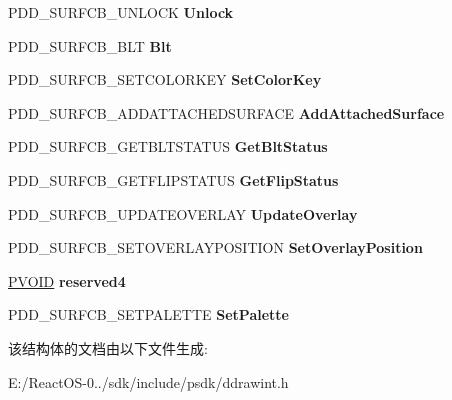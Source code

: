 \begin{DoxyCompactItemize}
P\+D\+D\+\_\+\+S\+U\+R\+F\+C\+B\+\_\+\+U\+N\+L\+O\+CK {\bfseries Unlock}
\item 
\mbox{\label{struct_d_d___s_u_r_f_a_c_e_c_a_l_l_b_a_c_k_s_a803378ce84a5ddebf064655f46c0bf34}} 
P\+D\+D\+\_\+\+S\+U\+R\+F\+C\+B\+\_\+\+B\+LT {\bfseries Blt}
\item 
\mbox{\label{struct_d_d___s_u_r_f_a_c_e_c_a_l_l_b_a_c_k_s_aa207143ebab6b0e03e54b4d7a7ff175a}} 
P\+D\+D\+\_\+\+S\+U\+R\+F\+C\+B\+\_\+\+S\+E\+T\+C\+O\+L\+O\+R\+K\+EY {\bfseries Set\+Color\+Key}
\item 
\mbox{\label{struct_d_d___s_u_r_f_a_c_e_c_a_l_l_b_a_c_k_s_a9d5d0b560662ddba80638b71e8c20d50}} 
P\+D\+D\+\_\+\+S\+U\+R\+F\+C\+B\+\_\+\+A\+D\+D\+A\+T\+T\+A\+C\+H\+E\+D\+S\+U\+R\+F\+A\+CE {\bfseries Add\+Attached\+Surface}
\item 
\mbox{\label{struct_d_d___s_u_r_f_a_c_e_c_a_l_l_b_a_c_k_s_ac423a267ea9a872103f494acae1fb590}} 
P\+D\+D\+\_\+\+S\+U\+R\+F\+C\+B\+\_\+\+G\+E\+T\+B\+L\+T\+S\+T\+A\+T\+US {\bfseries Get\+Blt\+Status}
\item 
\mbox{\label{struct_d_d___s_u_r_f_a_c_e_c_a_l_l_b_a_c_k_s_aa64709dfb2ed4a938ff433936e52659e}} 
P\+D\+D\+\_\+\+S\+U\+R\+F\+C\+B\+\_\+\+G\+E\+T\+F\+L\+I\+P\+S\+T\+A\+T\+US {\bfseries Get\+Flip\+Status}
\item 
\mbox{\label{struct_d_d___s_u_r_f_a_c_e_c_a_l_l_b_a_c_k_s_a158944a990dc71df95da2a07ab97f860}} 
P\+D\+D\+\_\+\+S\+U\+R\+F\+C\+B\+\_\+\+U\+P\+D\+A\+T\+E\+O\+V\+E\+R\+L\+AY {\bfseries Update\+Overlay}
\item 
\mbox{\label{struct_d_d___s_u_r_f_a_c_e_c_a_l_l_b_a_c_k_s_af6d0a92061ad6548bc9607b2ab30d7ee}} 
P\+D\+D\+\_\+\+S\+U\+R\+F\+C\+B\+\_\+\+S\+E\+T\+O\+V\+E\+R\+L\+A\+Y\+P\+O\+S\+I\+T\+I\+ON {\bfseries Set\+Overlay\+Position}
\item 
\mbox{\label{struct_d_d___s_u_r_f_a_c_e_c_a_l_l_b_a_c_k_s_a4715354d66e9ba6b1312a41b3c36df4c}} 
\hyperlink{interfacevoid}{P\+V\+O\+ID} {\bfseries reserved4}
\item 
\mbox{\label{struct_d_d___s_u_r_f_a_c_e_c_a_l_l_b_a_c_k_s_a62c5803a8cfe5a221bb630d34366b29a}} 
P\+D\+D\+\_\+\+S\+U\+R\+F\+C\+B\+\_\+\+S\+E\+T\+P\+A\+L\+E\+T\+TE {\bfseries Set\+Palette}
\end{DoxyCompactItemize}


该结构体的文档由以下文件生成\+:\begin{DoxyCompactItemize}
\item 
E\+:/\+React\+O\+S-\/0../sdk/include/psdk/ddrawint.\+h\end{DoxyCompactItemize}
